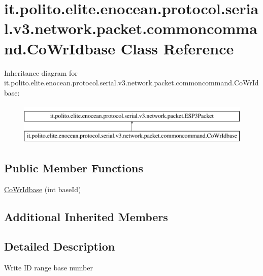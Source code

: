 \hypertarget{classit_1_1polito_1_1elite_1_1enocean_1_1protocol_1_1serial_1_1v3_1_1network_1_1packet_1_1commoncommand_1_1_co_wr_idbase}{}\section{it.\+polito.\+elite.\+enocean.\+protocol.\+serial.\+v3.\+network.\+packet.\+commoncommand.\+Co\+Wr\+Idbase Class Reference}
\label{classit_1_1polito_1_1elite_1_1enocean_1_1protocol_1_1serial_1_1v3_1_1network_1_1packet_1_1commoncommand_1_1_co_wr_idbase}
Inheritance diagram for it.\+polito.\+elite.\+enocean.\+protocol.\+serial.\+v3.\+network.\+packet.\+commoncommand.\+Co\+Wr\+Idbase\+:\begin{figure}[H]
\begin{center}
\leavevmode
\includegraphics[height=2.000000cm]{classit_1_1polito_1_1elite_1_1enocean_1_1protocol_1_1serial_1_1v3_1_1network_1_1packet_1_1commoncommand_1_1_co_wr_idbase}
\end{center}
\end{figure}
\subsection*{Public Member Functions}
\begin{DoxyCompactItemize}
\item 
\hyperlink{classit_1_1polito_1_1elite_1_1enocean_1_1protocol_1_1serial_1_1v3_1_1network_1_1packet_1_1commoncommand_1_1_co_wr_idbase_a93fe11ee914b480b19aa12128bb01dc3}{Co\+Wr\+Idbase} (int base\+Id)
\end{DoxyCompactItemize}
\subsection*{Additional Inherited Members}


\subsection{Detailed Description}
Write ID range base number

